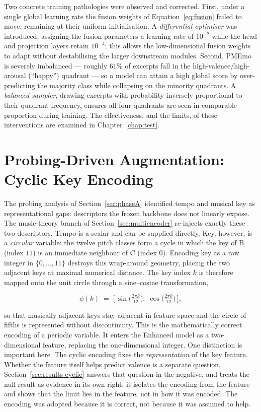 \documentclass[12pt]{report}
\begin{document}
Two concrete training pathologies were observed and corrected. First, under a single global learning rate the fusion weights of Equation~\ref{eq:fusion} failed to move, remaining at their uniform initialisation. A \emph{differential optimiser} was introduced, assigning the fusion parameters a learning rate of $10^{-2}$ while the head and projection layers retain $10^{-4}$; this allows the low-dimensional fusion weights to adapt without destabilising the larger downstream modules. Second, PMEmo is severely imbalanced --- roughly $61\%$ of excerpts fall in the high-valence/high-arousal (``happy'') quadrant --- so a model can attain a high global score by over-predicting the majority class while collapsing on the minority quadrants. A \emph{balanced sampler}, drawing excerpts with probability inversely proportional to their quadrant frequency, ensures all four quadrants are seen in comparable proportion during training. The effectiveness, and the limits, of these interventions are examined in Chapter~\ref{chap:test}.

\section{Probing-Driven Augmentation: Cyclic Key Encoding}
\label{sec:cyclickey}

The probing analysis of Section~\ref{sec:phaseA} identified tempo and musical key as representational gaps: descriptors the frozen backbone does not linearly expose. The music-theory branch of Section~\ref{sec:multiencoder} re-injects exactly these two descriptors. Tempo is a scalar and can be supplied directly. Key, however, is a \emph{circular} variable: the twelve pitch classes form a cycle in which the key of B (index $11$) is an immediate neighbour of C (index $0$). Encoding key as a raw integer in $\{0,\dots,11\}$ destroys this wrap-around geometry, placing the two adjacent keys at maximal numerical distance. The key index $k$ is therefore mapped onto the unit circle through a sine--cosine transformation,

\begin{equation}
\label{eq:cyclic}
\phi(k) \;=\; \Big[\,\sin\!\big(\tfrac{2\pi k}{12}\big),\; \cos\!\big(\tfrac{2\pi k}{12}\big)\,\Big],
\end{equation}

so that musically adjacent keys stay adjacent in feature space and the circle of fifths is represented without discontinuity. This is the mathematically correct encoding of a periodic variable. It enters the Enhanced model as a two-dimensional feature, replacing the one-dimensional integer. One distinction is important here. The cyclic encoding fixes the \emph{representation} of the key feature. Whether the feature itself helps predict valence is a separate question. Section~\ref{sec:results-cyclic} answers that question in the negative, and treats the null result as evidence in its own right: it isolates the encoding from the feature and shows that the limit lies in the feature, not in how it was encoded. The encoding was adopted because it is correct, not because it was assumed to help.
\end{document}
